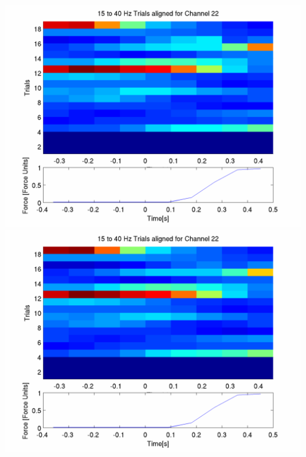 \documentclass[12pt]{article}
\begin{document}
\includegraphics[scale=0.2]{noCAR/plot_1_aligned_trials.png}
\includegraphics[scale=0.2]{WithCAR/plot_1_aligned_trials.png}
\end{document}

